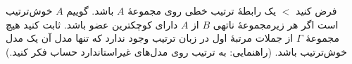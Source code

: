 فرض کنید $<$ یک رابطهٔ ترتیب خطی روی مجموعهٔ $A$ باشد. گوییم $A$ خوش‌ترتیب است اگر هر زیرمجموعهٔ ناتهی $B$ از $A$ دارای کوچکترین عضو باشد. ثابت کنید هیچ مجموعهٔ $\Gamma$ از جملات مرتبهٔ اول در زبان ترتیب وجود ندارد که تنها مدل آن یک مدل خوش‌ترتیب باشد.
(راهنمایی: به ترتیب روی مدل‌های غیراستاندارد حساب فکر کنید.)